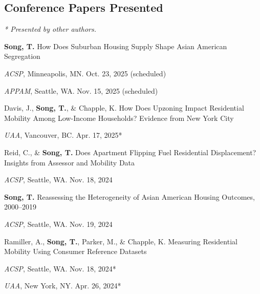 \documentclass[11pt,letterpaper]{article}
\newcommand{\term}[1]{(#1)}
\begin{document}
\subsection{Conference Papers Presented}
{\footnotesize\emph{* Presented by other authors.}}\par\vspace{.35\baselineskip}
\begin{subpoints}
  \item \textbf{Song, T.} How Does Suburban Housing Supply Shape Asian American Segregation
    \begin{subpoints2}
      \item \emph{ACSP}, Minneapolis, MN. Oct. 23, 2025 \term{scheduled}
      \item \emph{APPAM}, Seattle, WA. Nov. 15, 2025 \term{scheduled}
    \end{subpoints2}

  \item Davis, J., \textbf{Song, T.}, \& Chapple, K. How Does Upzoning Impact Residential Mobility Among Low-Income Households? Evidence from New York City
    \begin{subpoints2}
      \item \emph{UAA}, Vancouver, BC. Apr. 17, 2025*
    \end{subpoints2}

  \item Reid, C., \& \textbf{Song, T.} Does Apartment Flipping Fuel Residential Displacement? Insights from Assessor and Mobility Data
    \begin{subpoints2}
      \item \emph{ACSP}, Seattle, WA. Nov. 18, 2024
    \end{subpoints2}

  \item \textbf{Song, T.} Reassessing the Heterogeneity of Asian American Housing Outcomes, 2000–2019
    \begin{subpoints2}
      \item \emph{ACSP}, Seattle, WA. Nov. 19, 2024
    \end{subpoints2}

  \item Ramiller, A., \textbf{Song, T.}, Parker, M., \& Chapple, K. Measuring Residential Mobility Using Consumer Reference Datasets
    \begin{subpoints2}
      \item \emph{ACSP}, Seattle, WA. Nov. 18, 2024*
      \item \emph{UAA}, New York, NY. Apr. 26, 2024*
    \end{subpoints2}


\end{subpoints}
\end{document}
